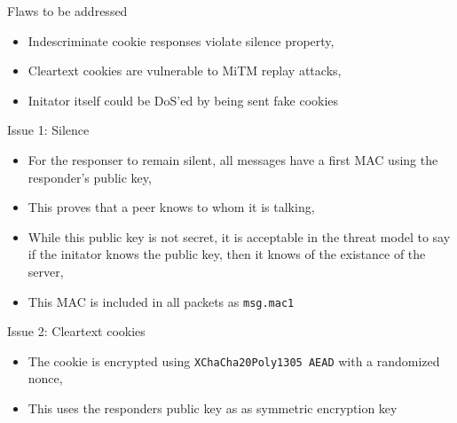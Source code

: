 \documentclass{beamer}
\begin{document}
    \begin{frame}{Flaws to be addressed}
        \begin{itemize}
            \item Indescriminate cookie responses violate silence property,
            \item Cleartext cookies are vulnerable to MiTM replay attacks,
            \item Initator itself could be DoS'ed by being sent fake cookies
        \end{itemize}
    \end{frame}

    \begin{frame}{Issue 1: Silence}
        \begin{itemize}
            \item For the responser to remain silent, all messages have a first MAC using the responder's public key,
            \item This proves that a peer knows to whom it is talking,
            \item While this public key is not secret, it is acceptable in the threat model to say if the initator knows the public key, then it knows of the existance of the server,
            \item This MAC is included in all packets as \texttt{msg.mac1}
        \end{itemize}
    \end{frame}

    \begin{frame}{Issue 2: Cleartext cookies}
    \begin{itemize}
        \item The cookie is encrypted using \texttt{XChaCha20Poly1305 AEAD} with a randomized nonce,
        \item This uses the responders public key as as symmetric encryption key
    \end{itemize}
    \end{frame}
\end{document}
